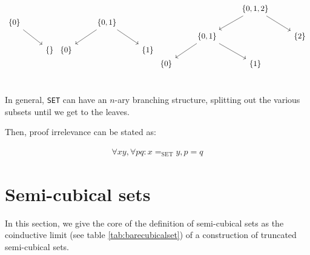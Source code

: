 \documentclass[10pt]{art}
\begin{document}
\begin{equation*}
  \begin{tikzcd}
    \{0\} \arrow[dr] & \\
    & \{\} \\
  \end{tikzcd}
  \begin{tikzcd}
    & \{0, 1\} \arrow[dr]\arrow[dl] & \\
    \{0\} & & \{1\} \\
  \end{tikzcd}
  \begin{tikzcd}
    & & \{0, 1, 2\} \arrow[dr]\arrow[dl] & \\
    & \{0, 1\} \arrow[dl]\arrow[dr] & & \{2\} \\
    \{0\} & & \{1\} & \\
  \end{tikzcd}
\end{equation*}

In general, \texttt{SET} can have an $n$-ary branching structure, splitting out the various subsets until we get to the leaves.

Then, proof irrelevance can be stated as:

\begin{align*}
  \forall x y, \forall p q : x =_{\textrm{SET}} y, p = q
\end{align*}

\section{Semi-cubical sets}
In this section, we give the core of the definition of semi-cubical
sets as the coinductive limit (see table \ref{tab:barecubicalset}) of a
construction of truncated semi-cubical sets.
\end{document}
